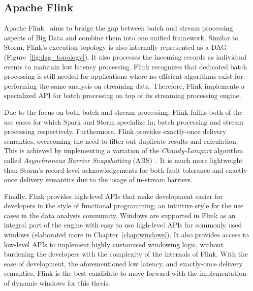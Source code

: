 \subsection{Apache Flink}%
\label{sub:Apache Flink}

Apache Flink~\cite{flink} aims to bridge the gap between batch and stream processing aspects of 
Big Data and combine them into one unified framework. Similar to Storm, 
Flink's execution topology is also internally represented as a DAG (Figure~\ref{fig:dag_topology}).
It also processes the incoming records as 
individual events to maintain low latency processing. Flink recognizes that
dedicated batch processing is still needed for applications where no efficient algorithms 
exist for performing the same analysis on streaming data. Therefore, Flink implements a 
specialized API for batch processing on top of its streaming processing engine.

Due to the focus on both batch and stream processing, Flink fulfils both 
of the use cases for which 
Spark and Storm specialize in; batch processing and stream processing respectively. Furthermore, 
Flink provides exactly-once delivery semantics, overcoming the need to filter out duplicate 
results and calculation. This is achieved by implementing a variation of the \emph{Chandy-Lamport} algorithm
called \emph{Asynchronous Barrier Snapshotting} (ABS)~\cite{asynchronous_barrier}.
It is much more lightweight than Storm's record-level 
acknowledgements for both fault tolerance and exactly-once delivery semantics
due to the usage of in-stream barriers.  

Finally, Flink provides high-level APIs that make development easier for developers in 
the style of functional programming; an intuitive style for the use cases in the data analysis community. 
Windows are supported in Flink as an integral part of the engine with easy to use high-level APIs for 
commonly used windows (elaborated more in Chapter~\ref{chap:windows}).  
It also provides access to low-level APIs to implement highly customised windowing logic, without burdening 
the developers with the complexity of the internals of Flink. 
With the ease of development, the aforementioned low latency, and exactly-once delivery semantics, 
Flink is the best candidate to move forward with the implementation of dynamic windows for this thesis. 
